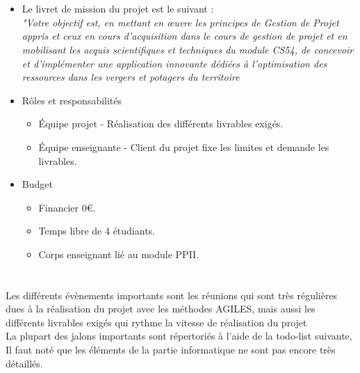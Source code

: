 \documentclass{report}
\begin{document}
\section*{\color{orange}{\Large Organisation / ressources, budget}}
\begin{itemize}
    \item Le livret de mission du projet est le suivant : \\ 
    \textit{"Votre objectif est, en mettant en œuvre les principes de Gestion de Projet appris et
    ceux en cours d’acquisition dans le cours de gestion de projet et en mobilisant les acquis
    scientifiques et techniques du module CS54, de concevoir et d’implémenter une application
    innovante dédiées à l’optimisation des ressources dans les vergers et potagers du territoire}
    \item Rôles et responsabilités
    \begin{itemize}
        \item Équipe projet - Réalisation des différents livrables exigés.
        \item Équipe enseignante - Client du projet fixe les limites et demande les livrables.
    \end{itemize}
    \item Budget
    \begin{itemize}
        \item Financier 0€.
        \item Temps libre de 4 étudiants.
        \item Corps enseignant lié au module PPII.
    \end{itemize}
    
\end{itemize}
\section*{\color{orange}{\Large Jalons : échéancier / évènements importants }}
Les différents évènements importants sont les réunions qui sont très régulières dues à la réalisation du projet avec les méthodes AGILES, mais aussi les différents livrables exigés qui rythme la vitesse de réalisation du projet
\vspace{0.5cm} \\
La plupart des jalons importants sont répertoriés à l'aide de la todo-list suivante, Il faut noté que les éléments de la partie informatique ne sont pas encore très détaillés.
\end{document}
